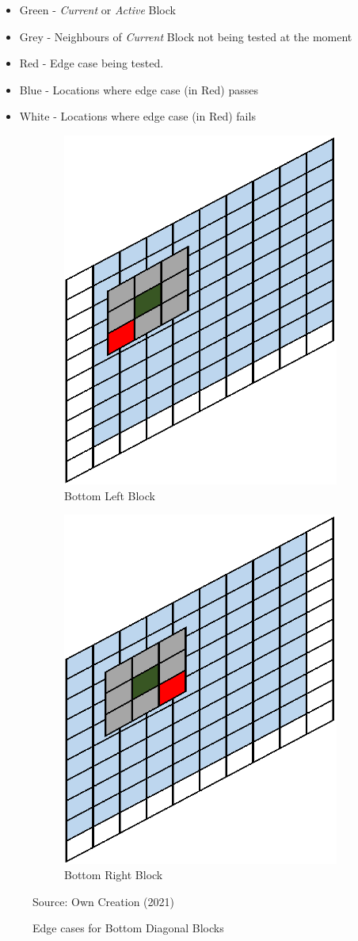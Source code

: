 \begin{itemize}
\item Green - \textit{Current} or \textit{Active} Block
\item Grey - Neighbours of \textit{Current} Block not being tested at the moment
\item Red - Edge case being tested.
\item Blue - Locations where edge case (in Red) passes
\item White - Locations where edge case (in Red) fails 
\end{itemize}

\begin{figure}[H]
\centering
\begin{subfigure}{.4\textwidth}
  \centering
  \includegraphics[width=.5\linewidth]{Figures/Chapter3/botleft}
  \caption{Bottom Left Block}
\end{subfigure}%
\begin{subfigure}{.4\textwidth}
  \centering
  \includegraphics[width=.5\linewidth]{Figures/Chapter3/botright}
  \caption{Bottom Right Block}
\end{subfigure}
\caption{Edge cases for Bottom Diagonal Blocks}
\begin{center}
Source: Own Creation (2021)
\end{center}
\label{fig:e1}
\end{figure}


